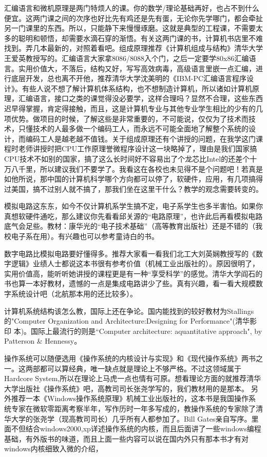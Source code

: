 汇编语言和微机原理是两门特烦人的课。你的数学/理论基础再好，也占不到什么便宜。这两门课之间的次序也好比先有鸡还是先有蛋，无论你先学哪门，都会牵扯另一门课里的东西。所以，只能静下来慢慢琢磨。这就是典型的工程课，不需要太多的聪明和顿悟，却需要水滴石穿的渐悟。有关这两门课的书，计算机书店里不难找到。弄几本最新的，对照着看吧。组成原理推荐《计算机组成与结构》清华大学王爱英教授写的。汇编语言大家拿8086/8088入个门，之后一定要学80x86汇编语言。实用价值大，不落后，结构又好，写写高效病毒，高级语言里嵌一点汇编，进行底层开发，总也离不开他，推荐清华大学沈美明的《IBM-PC汇编语言程序设计》。有些人说不想了解计算机体系结构，也不想制造计算机，所以诸如计算机原理，汇编语言，接口之类的课觉得没必要学，这样合理吗？显然不合理，这些东西迟早得掌握，肯定得接触，而且，这是计算机专业与其他专业学生相比的少有的几项优势。做项目的时候，了解这些是非常重要的，不可能说，仅仅为了技术而技术，只懂技术的人最多做一个编码工人，而永远不可能全面地了解整个系统的设计，而编码工人是越老越不值钱。关于组成原理还有个讲授的问题，在我学这门课程时老师讲授时把CPU工作原理誉微程序设计这一块略掉了，理由是我们国家搞CPU技术不如别的国家，搞了这么长时间好不容易出了个龙芯比Intel的还差个十万八千里，所以建议我们不要学了。我看这在各校也未见得不是个问题吧！若真是如他所说，那中国的计算机科学哪个方向都可以停了，软硬件，应用，有几项搞得过美国，搞不过别人就不搞了，那我们坐在这里干什么？教学的观念需要转变的。


模拟电路这东东，如今不仅计算机系学生搞不定，电子系学生也多半害怕。如果你真想软硬件通吃，那么建议你先看看邱关源的“电路原理”，也许此后再看模拟电路底气会足些。教材：康华光的“电子技术基础”（高等教育出版社）还是不错的（我校电子系在用）。有兴趣也可以参考童诗白的书。


数字电路比模拟电路要好懂得多。推荐大家看一看我们北工大刘英娴教授写的《数字逻辑》业绩人士都说这本书很有参考价值（机械工业出版社的）。原因很明了，实用价值高，能听听她讲授的课程更是有一种“享受科学”的感觉。清华大学阎石的书也算一本好教材，遗憾的一点是集成电路讲少了些。真有兴趣，看一看大规模数字系统设计吧（北航那本用的还比较多）。


计算机系统结构该怎么教，国际上还在争论。国内能找到的较好教材为Stallings的"Computer Organization and Architecture:Designing for Performance"(清华影印 
本)。国际上最流行的则是“Computer architecture: aquantitative approach", by Patterson \& Hennessy。


操作系统可以随便选用《操作系统的内核设计与实现》和《现代操作系统》两书之一。这两部都可以算经典，唯一缺点就是理论上不够严格。不过这领域属于Hardcore System,所以在理论上马虎一点也情有可原。想看理论方面的就推荐清华大学出版社《操作系统》吧，高教司司长张尧学写的，我们教材用的是那本。 另外推荐一本《Windows操作系统原理》机械工业出版社的，这本书是我国操作系统专家在微软零距离考察半年，写作历时一年多写成的，教操作系统的专家除了清华大学的张尧学（现高教司司长）几乎所有人都参加了。Bill Gates亲自写序。里面不但结合windows2000,xp详述操作系统的内核，而且后面讲了一些windows编程基础，有外版书的味道，而且上面一些内容可以说在国内外只有那本书才有对windows内核细致入微的介绍，


